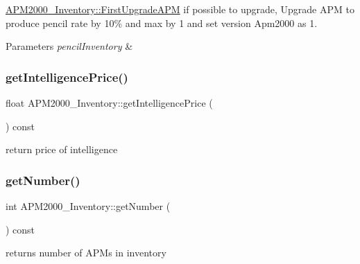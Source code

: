\mbox{\hyperlink{classAPM2000__Inventory_a5e40a4bddfb46321d256787f678808f7}{A\+P\+M2000\+\_\+\+Inventory\+::\+First\+Upgrade\+A\+PM}} if possible to upgrade, Upgrade A\+PM to produce pencil rate by 10\% and max by 1 and set version Apm2000 as 1. 


\begin{DoxyParams}{Parameters}
{\em pencil\+Inventory} & \\
\hline
\end{DoxyParams}
\mbox{\label{classAPM2000__Inventory_af68c4aa1dea90188b7837de90d6be1bc}} 
\subsubsection{\texorpdfstring{getIntelligencePrice()}{getIntelligencePrice()}}
{\footnotesize\ttfamily float A\+P\+M2000\+\_\+\+Inventory\+::get\+Intelligence\+Price (\begin{DoxyParamCaption}{ }\end{DoxyParamCaption}) const}



return price of intelligence 

\mbox{\label{classAPM2000__Inventory_a9a9bacffea28885b6c268d9a3bcab401}} 
\subsubsection{\texorpdfstring{getNumber()}{getNumber()}}
{\footnotesize\ttfamily int A\+P\+M2000\+\_\+\+Inventory\+::get\+Number (\begin{DoxyParamCaption}{ }\end{DoxyParamCaption}) const}



returns number of A\+P\+Ms in inventory 

\mbox{\label{classAPM2000__Inventory_a65388780b7aa2066cfaf86c85d501765}} 
